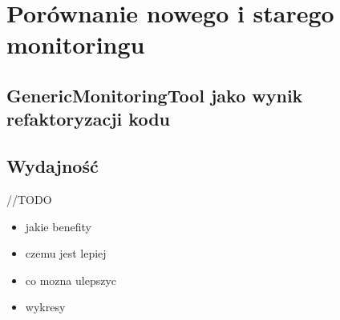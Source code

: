 \section{Porównanie nowego i starego monitoringu}



\subsection{GenericMonitoringTool jako wynik refaktoryzacji kodu}
\subsection{Wydajność}

//TODO
\begin{itemize}
\item jakie benefity
\item czemu jest lepiej
\item co mozna ulepszyc
\item wykresy
\end{itemize}
